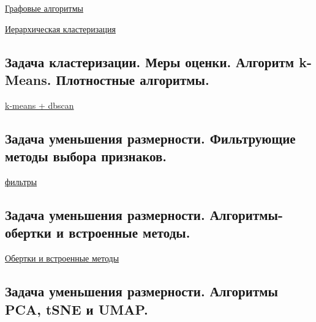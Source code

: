 \documentclass{article}
\begin{document}
\href{
	http://www.machinelearning.ru/wiki/images/archive/2/28/20150427184336%
}{Графовые алгоритмы}

\href{
	https://neerc.ifmo.ru/wiki/index.php?title=%
}{Иерархическая кластеризация}


\subsection{Задача кластеризации. Меры оценки. Алгоритм k-Means. Плотностные
алгоритмы.}

\href{
	https://neerc.ifmo.ru/wiki/index.php?title=%
}{k-means + dbscan}



\subsection{Задача уменьшения размерности. Фильтрующие методы выбора признаков.}
\label{sec:dim_reduction}

\href{
	https://neerc.ifmo.ru/wiki/index.php?title=%
}{фильтры}


\subsection{Задача уменьшения размерности. Алгоритмы-обертки и встроенные методы.}

\href{
	https://neerc.ifmo.ru/wiki/index.php?title=%
}{Обертки и встроенные методы}


\subsection{Задача уменьшения размерности. Алгоритмы PCA, tSNE и UMAP.}
\end{document}
